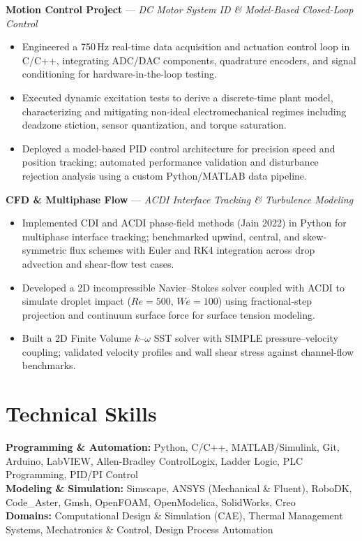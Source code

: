 \documentclass[10pt, letterpaper]{article}
\begin{document}
\vspace{+0.5mm}
\textbf{Motion Control Project} — \textit{DC Motor System ID \& Model-Based Closed-Loop Control} \\[-2pt]
\vspace{0.1mm}
\begin{itemize}[leftmargin=1.5em,itemsep=2pt,topsep=2pt]
    \item Engineered a 750\,Hz real-time data acquisition and actuation control loop in C/C++, integrating ADC/DAC components, quadrature encoders, and signal conditioning for hardware-in-the-loop testing.
    \item Executed dynamic excitation tests to derive a discrete-time plant model, characterizing and mitigating non-ideal electromechanical regimes including deadzone stiction, sensor quantization, and torque saturation.
    \item Deployed a model-based PID control architecture for precision speed and position tracking; automated performance validation and disturbance rejection analysis using a custom Python/MATLAB data pipeline.
\end{itemize}
\vspace{+0.5mm}

\textbf{CFD \& Multiphase Flow} — \textit{ACDI Interface Tracking \& Turbulence Modeling} \\[-2pt]
\vspace{0.1mm}
\begin{itemize}[leftmargin=1.5em,itemsep=2pt,topsep=2pt]
    \item Implemented CDI and ACDI phase-field methods (Jain 2022) in Python for multiphase interface tracking; benchmarked upwind, central, and skew-symmetric flux schemes with Euler and RK4 integration across drop advection and shear-flow test cases.
    \item Developed a 2D incompressible Navier--Stokes solver coupled with ACDI to simulate droplet impact ($Re=500$, $We=100$) using fractional-step projection and continuum surface force for surface tension modeling.
    \item Built a 2D Finite Volume $k$--$\omega$ SST solver with SIMPLE pressure--velocity coupling; validated velocity profiles and wall shear stress against channel-flow benchmarks.
\end{itemize}


\section*{Technical Skills}
\textbf{Programming \& Automation:} Python, C/C++, MATLAB/Simulink, Git, Arduino, LabVIEW, Allen-Bradley ControlLogix, Ladder Logic, PLC Programming, PID/PI Control  \\
\textbf{Modeling \& Simulation:} Simscape, ANSYS (Mechanical \& Fluent), RoboDK, Code\_Aster, Gmsh, OpenFOAM, OpenModelica, SolidWorks, Creo \\
\textbf{Domains:} Computational Design \& Simulation (CAE), Thermal Management Systems, Mechatronics \& Control, Design Process Automation 
\end{document}
